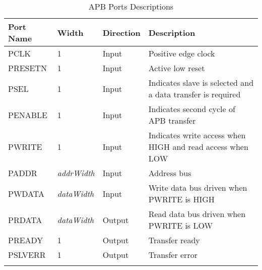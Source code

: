 \renewcommand*{\arraystretch}{1.4}
\begin{longtable}[H]{
  | p{}
  | p{}
  | p{}
  | p{} |
  }
  \hline
  \textbf{Port Name} &   
  \textbf{Width} &   
  \textbf{Direction} &   
  \textbf{Description} \\ \hline \hline

  PCLK &       
  1 &       
  Input &       
  Positive edge clock \\ \hline

  PRESETN &       
  1 &       
  Input &       
  Active low reset \\ \hline

  PSEL &       
  1 & 
  Input &       
  Indicates slave is selected and a data transfer is required \\ \hline

  PENABLE &        
  1 & 
  Input &       
  Indicates second cycle of APB transfer \\ \hline

  PWRITE &        
  1 & 
  Input &       
  Indicates write access when HIGH and read access when LOW\\ \hline

  PADDR &      
  \textit{addrWidth} & 
  Input &     
  Address bus \\ \hline

  PWDATA &      
  \textit{dataWidth} & 
  Input &     
  Write data bus driven when PWRITE is HIGH\\ \hline

  PRDATA &      
  \textit{dataWidth} & 
  Output &     
  Read data bus driven when PWRITE is LOW\\ \hline
 
  PREADY &        
  1 & 
  Output &       
  Transfer ready \\ \hline

  PSLVERR &        
  1 & 
  Output &       
  Transfer error \\ \hline

  \caption{APB Ports Descriptions}\label{table:interface}
\end{longtable}
